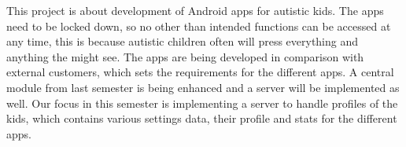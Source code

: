 This project is about development of Android apps for autistic kids. The apps need to be locked down, so no other than intended functions can be accessed at any time, this is because autistic children often will press everything and anything the might see. The apps are being developed in comparison with external customers, which sets the requirements for the different apps. A central module from last semester is being enhanced and a server will be implemented as well. Our focus in this semester is implementing a server to handle profiles of the kids, which contains various settings data, their profile and stats for the different apps.
